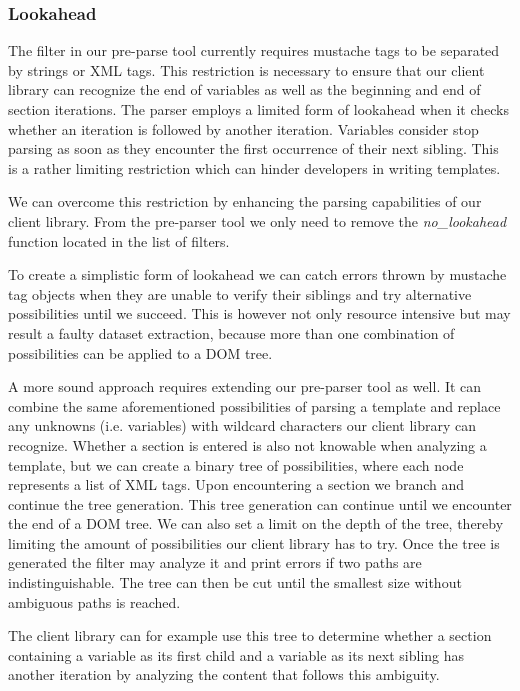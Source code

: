 \documentclass[thesis.tex]{subfiles}
\begin{document}
\subsubsection{Lookahead}
\label{sec:lookahead}
The filter in our pre-parse tool currently requires mustache tags to be
separated by strings or XML tags. This restriction is necessary to ensure that
our client library can recognize the end of variables as well as the beginning
and end of section iterations. The parser employs a limited form of lookahead
when it checks whether an iteration is followed by another iteration. Variables
consider stop parsing as soon as they encounter the first occurrence of their
next sibling. This is a rather limiting restriction which can hinder developers
in writing templates.

We can overcome this restriction by enhancing the parsing capabilities of our
client library. From the pre-parser tool we only need to remove the
\emph{no\_lookahead} function located in the list of filters.

To create a simplistic form of lookahead we can catch errors thrown by
mustache tag objects when they are unable to verify their siblings and try
alternative possibilities until we succeed. This is however not only resource
intensive but may result a faulty dataset extraction, because more than one
combination of possibilities can be applied to a DOM tree.

A more sound approach requires extending our pre-parser tool as well. It can
combine the same aforementioned possibilities of parsing a template and replace
any unknowns (i.e. variables) with wildcard characters our client library can
recognize. Whether a section is entered is also not knowable when
analyzing a template, but we can create a binary tree of possibilities,
where each node represents a list of XML tags. Upon encountering a section we
branch and continue the tree generation. This tree generation can continue until
we encounter the end of a DOM tree. We can also set a limit on the depth of the
tree, thereby limiting the amount of possibilities our client library has to
try. Once the tree is generated the filter may analyze it and print errors if
two paths are indistinguishable. The tree can then be cut until the smallest
size without ambiguous paths is reached.

The client library can for example use this tree to determine whether a
section containing a variable as its first child and a variable as its
next sibling has another iteration by analyzing the content that follows this
ambiguity.
\end{document}
